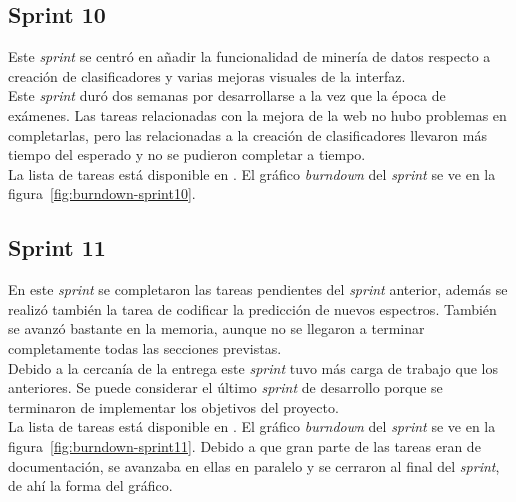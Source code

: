 
\subsection{Sprint 10}
Este \textit{sprint} se centró en añadir la funcionalidad de minería de datos
respecto a creación de clasificadores y varias mejoras visuales de la
interfaz.\\

Este \textit{sprint} duró dos semanas por desarrollarse a la vez que la época de
exámenes. Las tareas relacionadas con la mejora de la web no hubo problemas en
completarlas, pero las relacionadas a la creación de clasificadores llevaron más
tiempo del esperado y no se pudieron completar a tiempo.\\

La lista de tareas está disponible en
. El gráfico \textit{burndown} del \textit{sprint} se ve en la
figura~\ref{fig:burndown-sprint10}.\\


\subsection{Sprint 11}
En este \textit{sprint} se completaron las tareas pendientes del \textit{sprint}
anterior, además se realizó también la tarea de codificar la predicción de 
nuevos espectros. También se avanzó bastante en la memoria, aunque no se 
llegaron a terminar completamente todas las secciones previstas.\\

Debido a la cercanía de la entrega este \textit{sprint} tuvo más carga de
trabajo que los anteriores. Se puede considerar el último \textit{sprint} de
desarrollo porque se terminaron de implementar los objetivos del proyecto.\\

La lista de tareas está disponible en
. El gráfico \textit{burndown} del \textit{sprint} se ve en la
figura~\ref{fig:burndown-sprint11}. Debido a que gran parte de las tareas eran
de documentación, se avanzaba en ellas en paralelo y se cerraron al final del
\textit{sprint}, de ahí la forma del gráfico.\\

